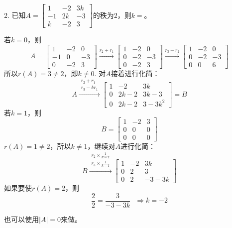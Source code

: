 \documentclass{article}
\begin{document}
2. 已知$A=
\begin{bmatrix}
  1 & -2 & 3k\\
 -1 & 2k & -3\\
 k & -2 & 3
\end{bmatrix}
$的秩为2，则$k=$\underline{\hphantom{~~~~~~~~~~}}。

\begin{jie}
若$k=0$，则
\begin{equation*}
A=\begin{bmatrix}
  1 & -2 & 0\\
 -1 & 0 & -3\\
 0 & -2 & 3
\end{bmatrix}
\xrightarrow{r_{2}+r_{1}}
{
\begin{bmatrix}
  1 & -2 & 0\\
 0 & -2 & -3\\
 0 & -2 & 3
\end{bmatrix}
}\xrightarrow{r_{3}-r_{2}}
{
\begin{bmatrix}
  1 & -2 & 0\\
 0 & -2 & -3\\
 0 & 0 & 6
\end{bmatrix}
}
\end{equation*}
所以$r(A)=3\neq2$，即$k\neq0$.
对$A$接着进行化简：
\begin{equation*}
  A\xrightarrow{\substack{r_{2}+r_{1} \\ r_{3}-kr_{1}}}
{
\begin{bmatrix}
  1 & -2 & 3k\\
 0 & 2k-2 & 3k-3\\
 0 & 2k-2 & 3-3k^{2}
\end{bmatrix}
}=B
\end{equation*}
若$k=1$，则
\begin{equation*}
B=
\begin{bmatrix}
  1 & -2 & 3\\
 0 & 0 & 0\\
 0 & 0 & 0
\end{bmatrix}
\end{equation*}
$r(A)=1\neq2$，所以$k\neq1$，继续对$A$进行化简：
\begin{equation*}
  B\xrightarrow{\substack{r_{2}\times\frac{1}{k-1} \\ r_{3}\times\frac{1}{k-1}}}
{
\begin{bmatrix}
  1 & -2 & 3k\\
 0 & 2 & 3\\
 0 & 2 & -3-3k
\end{bmatrix}
}
\end{equation*}
如果要使$r(A)=2$，则
\begin{equation*}
  \frac{2}{2}=\frac{3}{-3-3k}~~~\Rightarrow k=-2
\end{equation*}

也可以使用$|A|=0$来做。
\end{jie}
\end{document}

